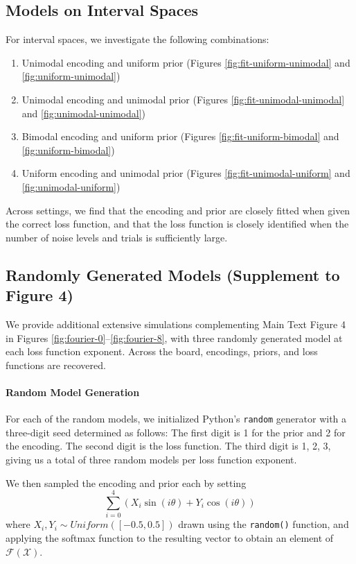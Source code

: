 \documentclass[si.tex]{subfiles}
\begin{document}
\subsection{Models on Interval Spaces}\label{sec:further-interval}
For interval spaces, we investigate the following combinations:
\begin{enumerate}
\item Unimodal encoding and uniform prior (Figures \ref{fig:fit-uniform-unimodal} and \ref{fig:uniform-unimodal})
\item Unimodal encoding and unimodal prior (Figures \ref{fig:fit-unimodal-unimodal} and \ref{fig:unimodal-unimodal})
\item Bimodal encoding and uniform prior (Figures \ref{fig:fit-uniform-bimodal} and \ref{fig:uniform-bimodal})
\item Uniform encoding and unimodal prior (Figures \ref{fig:fit-unimodal-uniform} and \ref{fig:unimodal-uniform})
\end{enumerate}
Across settings, we find that the encoding and prior are closely fitted when given the correct loss function, and that the loss function is closely identified when the number of noise levels and trials is sufficiently large.





\subsection{Randomly Generated Models (Supplement to Figure 4)}
We provide additional extensive simulations complementing Main Text Figure 4 in  Figures \ref{fig:fourier-0}--\ref{fig:fourier-8}, with three randomly generated model at each loss function exponent.
Across the board, encodings, priors, and loss functions are recovered.



\paragraph*{Random Model Generation}
For each of the random models, we initialized Python's \texttt{random} generator with a three-digit seed determined as follows: The first digit is 1 for the prior and 2 for the encoding. The second digit is the loss function. The third digit is 1, 2, 3, giving us a total of three random models per loss function exponent.

We then sampled the encoding and prior each by setting
\begin{equation}
\sum_{i=0}^4 \left( X_i \sin(i \theta) + Y_i \cos(i \theta) \right)
\end{equation}
where $X_i, Y_i \sim Uniform([-0.5, 0.5])$ drawn using the \texttt{random()} function, and applying the softmax function to the resulting vector to obtain an element of $\mathcal{F}(\mathcal{X})$.




\end{document}
